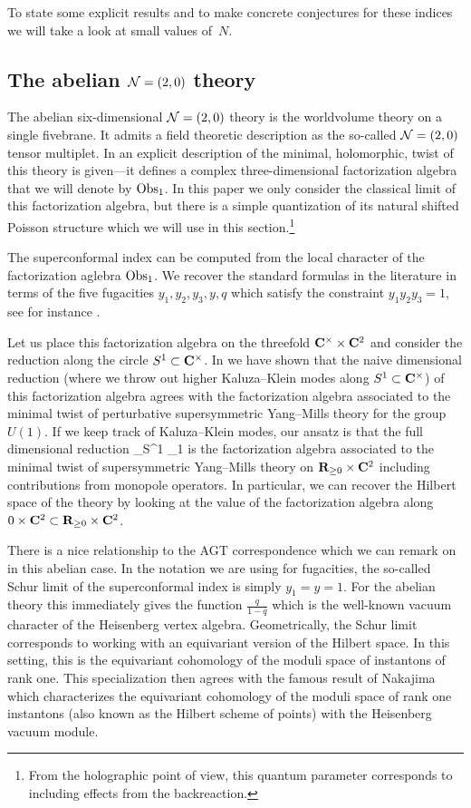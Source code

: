 \documentclass[11pt]{amsart}
\begin{document}
To state some explicit results and to make concrete conjectures for these indices we will take a look at small values of~$N$. 

\subsection*{The abelian $\mathcal N=(2,0)$ theory}

The abelian six-dimensional $\mathcal N=(2,0)$ theory is the worldvolume theory on a single fivebrane. 
It admits a field theoretic description as the so-called $\mathcal N=(2,0)$ tensor multiplet. 
In \cite{SWtensor} an explicit description of the minimal, holomorphic, twist of this theory is given---it defines a complex three-dimensional factorization algebra that we will denote by $\operatorname{Obs}_1$.
In this paper we only consider the classical limit of this factorization algebra, but there is a simple quantization of its natural shifted Poisson structure which we will use in this section.\footnote{From the holographic point of view, this quantum parameter corresponds to including effects from the backreaction.}

The superconformal index can be computed from the local character of the factorization aglebra $\operatorname{Obs}_1$. 
We recover the standard formulas in the literature in terms of the five fugacities $y_1,y_2,y_3,y,q$ which satisfy the constraint $y_1 y_2 y_3 = 1$, see for instance \cite{Kim:2013nva}.

Let us place this factorization algebra on the threefold $\mathbf{C}^\times \times \mathbf{C}^2$ and consider the reduction along the circle $S^1 \subset \mathbf{C}^\times$. 
In \cite{SWtensor} we have shown that the naive dimensional reduction (where we throw out higher Kaluza--Klein modes along $S^1 \subset \mathbf{C}^\times$) of this factorization algebra agrees with the factorization algebra associated to the minimal twist of perturbative supersymmetric Yang--Mills theory for the group $U(1)$. 
If we keep track of Kaluza--Klein modes, our ansatz is that the full dimensional reduction 
\beqn
\oint_{S^1} \Obs_1
\eeqn
is the factorization algebra associated to the minimal twist of supersymmetric Yang--Mills theory on $\mathbf{R}_{\geq 0} \times \mathbf{C}^2$ including contributions from monopole operators.
In particular, we can recover the Hilbert space of the theory by looking at the value of the factorization algebra along $0 \times \mathbf{C}^2 \subset \mathbf{R}_{\geq 0} \times \mathbf{C}^2$.

There is a nice relationship to the AGT correspondence which we can remark on in this abelian case. 
In the notation we are using for fugacities, the so-called Schur limit of the superconformal index is simply $y_1=y=1$.
For the abelian theory this immediately gives the function $\frac{q}{1-q}$ which is the well-known vacuum character of the Heisenberg vertex algebra. 
Geometrically, the Schur limit corresponds to working with an equivariant version of the Hilbert space.
In this setting, this is the equivariant cohomology of the moduli space of instantons of rank one.
This specialization then agrees with the famous result of Nakajima which characterizes the equivariant cohomology of the moduli space of rank one instantons (also known as the Hilbert scheme of points) with the Heisenberg vacuum module.
\end{document}

